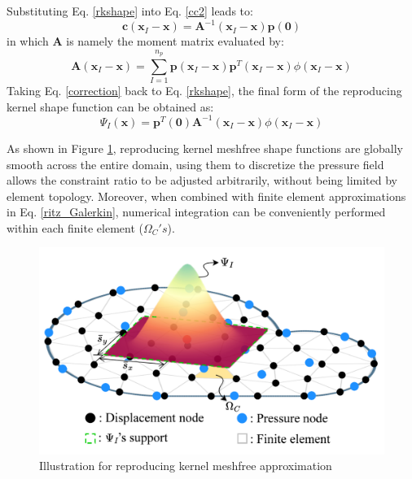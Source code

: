 Substituting Eq. \ref{rkshape} into Eq. \eqref{cc2} leads to:
\begin{equation}\label{correction}
\boldsymbol{c}(\boldsymbol{x}_I-\boldsymbol{x}) = \boldsymbol{A}^{-1}(\boldsymbol{x}_I-\boldsymbol{x}) \boldsymbol{p}(\boldsymbol{0})
\end{equation}
in which $\boldsymbol{A}$ is namely the moment matrix evaluated by:
\begin{equation}
\boldsymbol{A}(\boldsymbol{x}_I-\boldsymbol{x}) = \sum_{I=1}^{n_p} \boldsymbol{p}(\boldsymbol{x}_I-\boldsymbol{x}) \boldsymbol{p}^T(\boldsymbol{x}_I-\boldsymbol{x}) \phi(\boldsymbol{x}_I-\boldsymbol{x})
\end{equation}
Taking Eq. \eqref{correction} back to Eq. \eqref{rkshape}, the final form of the reproducing kernel shape function can be obtained as:
\begin{equation}
\Psi_I(\boldsymbol{x}) = \boldsymbol{p}^T(\boldsymbol{0}) \boldsymbol{A}^{-1}(\boldsymbol{x}_I-\boldsymbol{x}) \phi(\boldsymbol{x}_I-\boldsymbol{x})
\end{equation}

As shown in Figure \ref{fg:rk_approximation},
reproducing kernel meshfree shape functions are globally smooth across the entire domain,
using them to discretize the pressure field allows the constraint ratio to be adjusted arbitrarily, without being limited by element topology.
Moreover, when combined with finite element approximations in Eq. \ref{ritz_Galerkin},
numerical integration can be conveniently performed within each finite element ($\Omega_C's$).

\begin{figure}[H]
\centering
\includegraphics[width=\textwidth]{png/mix.png}
\caption{Illustration for reproducing kernel meshfree approximation}\label{fg:rk_approximation}
\end{figure}

